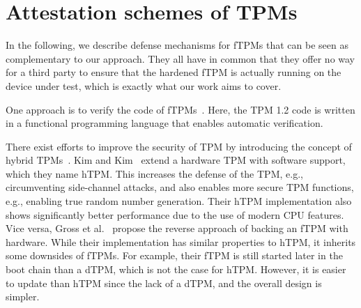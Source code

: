 
\section{Attestation schemes of TPMs}



In the following, we describe defense mechanisms for fTPMs that can be seen as complementary to our approach. They all have in common that they offer no way for a third party to ensure that the hardened fTPM is actually running on the device under test, which is exactly what our work aims to cover.

One approach is to verify the code of fTPMs~\cite{Mukhamedov2013}. Here, the TPM 1.2 code is written in a functional programming language that enables automatic verification.

There exist efforts to improve the security of TPM by introducing the concept of hybrid TPMs~\cite{Kim2019, Gross2021}. Kim and Kim~\cite{Kim2019} extend a hardware TPM with software support, which they name hTPM\@. This increases the defense of the TPM, e.g., circumventing side-channel attacks, and also enables more secure TPM functions, e.g., enabling true random number generation. Their hTPM implementation also shows significantly better performance due to the use of modern CPU features.
Vice versa, Gross et al.~\cite{Gross2021} propose the reverse approach of backing an fTPM with hardware. While their implementation has similar properties to hTPM, it inherits some downsides of fTPMs. For example, their fTPM is still started later in the boot chain than a dTPM, which is not the case for hTPM\@. However, it is easier to update than hTPM since the lack of a dTPM, and the overall design is simpler.





